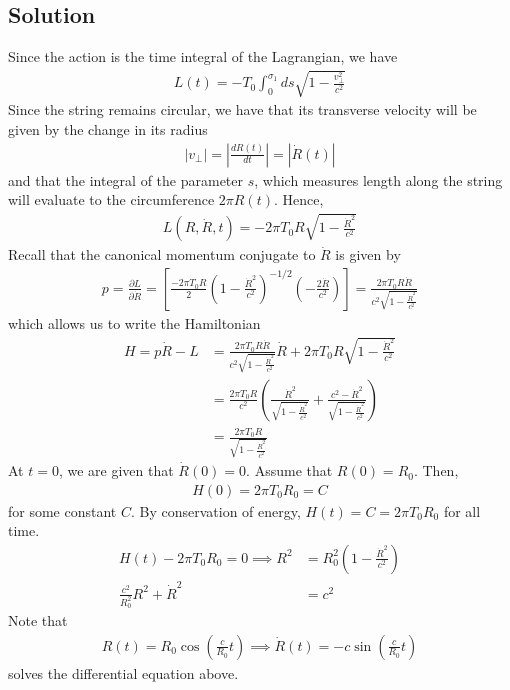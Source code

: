 \documentclass[11pt]{article}
\begin{document}
\subsection*{Solution}
Since the action is the time integral of the Lagrangian, we have 
\begin{align*}
    L(t) = -T_0 \int_{0}^{\sigma_1} ds \sqrt{1 - \frac{v_\perp^2}{c^2}}  \tag{Zwiebach 6.89}
\end{align*}
Since the string remains circular, we have that its transverse velocity will be given by the change in its radius
\begin{align*}
    |v_\perp| = \left|\frac{dR(t)}{dt} \right| = |\dot{R}(t)|
\end{align*}
and that the integral of the parameter $s$, which measures length along the string will evaluate to the circumference $2\pi R(t)$. Hence, 
\begin{align*}
    L(R, \dot{R}, t) = -2\pi T_0 R \sqrt{1 - \frac{\dot{R}^2}{c^2}}
\end{align*}
Recall that the canonical momentum conjugate to $\dot{R}$ is given by 
\begin{align*}
    p = \frac{\partial L}{\partial \dot{R}} = \left[\frac{-2\pi T_0 R}{2} \left( 1 - \frac{\dot{R}^2}{c^2}\right)^{-1/2} \left( -\frac{2\dot{R}}{c^2} \right) \right] = \frac{2\pi T_0 R \dot{R}}{c^2 \sqrt{1 - \frac{\dot{R}^2}{c^2}}}
\end{align*}
which allows us to write the Hamiltonian 
\begin{align*}
    H = p \dot{R} - L &= \frac{2\pi T_0 R \dot{R}}{c^2 \sqrt{1 - \frac{\dot{R}^2}{c^2}}} \dot{R} + 2\pi T_0 R \sqrt{1 - \frac{\dot{R}^2}{c^2}} \\
    &= \frac{2\pi T_0 R}{c^2} \left( \frac{\dot{R}^2}{\sqrt{1 - \frac{\dot{R}^2}{c^2}}} + \frac{c^2 - \dot{R}^2}{\sqrt{1 - \frac{\dot{R}^2}{c^2}}} \right) \\
    &= \frac{2\pi T_0 R}{\sqrt{1 - \frac{\dot{R}^2}{c^2}}}
\end{align*}
At $t =0$, we are given that $\dot{R}(0) = 0$. Assume that $R(0) = R_0$. Then, 
\begin{align*}
    H(0) = 2\pi T_0 R_0 = C 
\end{align*}
for some constant $C$. By conservation of energy, $H(t) = C = 2\pi T_0 R_0$ for all time. 
\begin{align*}
    H(t) - 2\pi T_0 R_0 = 0 \implies R^2 &= R_0^2 \left( 1 - \frac{\dot{R}^2}{c^2}\right) \\
    \frac{c^2}{R_0^2} R^2 + \dot{R}^2 &= c^2 
\end{align*} 
Note that 
\begin{align*}
    R(t) = R_0 \cos \left( \frac{c}{R_0}t\right) \implies \dot{R}(t) = -c \sin\left( \frac{c}{R_0}t \right) 
\end{align*}
solves the differential equation above. 
\end{document}
